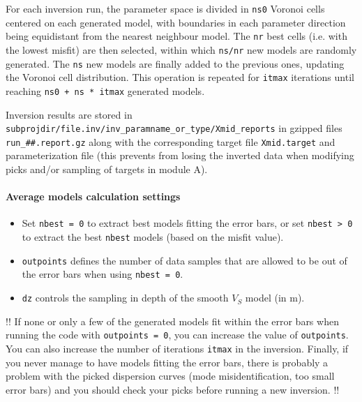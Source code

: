 \documentclass[twoside,a4paper]{article}
\begin{document}
For each inversion run, the parameter space is divided in \verb|ns0| Voronoi cells centered on each generated model, with boundaries in each parameter direction being equidistant from the nearest neighbour model. The \verb|nr| best cells (i.e. with the lowest misfit) are then selected, within which \verb|ns/nr| new models are randomly generated. The \verb|ns| new models are finally added to the previous ones, updating the Voronoi cell distribution. This operation is repeated for \verb|itmax| iterations until reaching \verb|ns0 + ns * itmax| generated models.

Inversion results are stored in \verb|subprojdir/file.inv/inv_paramname_or_type/Xmid_reports| in gzipped files \verb|run_##.report.gz| along with the corresponding target file \verb|Xmid.target| and parameterization file (this prevents from losing the inverted data when modifying picks and/or sampling of targets in module A).

\paragraph{Average models calculation settings}
\begin{itemize}[leftmargin=*]
\setlength\itemsep{2ex}
\item Set \verb|nbest = 0| to extract best models fitting the error bars, or set \verb|nbest > 0| to extract the best \verb|nbest| models (based on the misfit value).

\item \verb|outpoints| defines the number of data samples that are allowed to be out of the error bars when using \verb|nbest = 0|.

\item \verb|dz| controls the sampling in depth of the smooth $V_S$ model (in m).
\end{itemize}

!! If none or only a few of the generated models fit within the error bars when running the code with \verb|outpoints = 0|, you can increase the value of \verb|outpoints|. You can also increase the number of iterations \verb|itmax| in the inversion. Finally, if you never manage to have models fitting the error bars, there is probably a problem with the picked dispersion curves (mode misidentification, too small error bars) and you should check your picks before running a new inversion. !!
\end{document}
